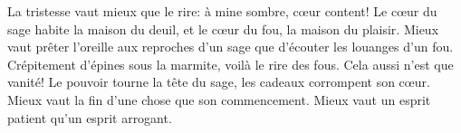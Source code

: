 La tristesse vaut mieux que le rire: à mine sombre, cœur content!
	Le cœur du sage habite la maison du deuil,
	et le cœur du fou, la maison du plaisir.
Mieux vaut prêter l’oreille aux reproches d’un sage
	que d’écouter les louanges d’un fou.
Crépitement d’épines sous la marmite, voilà le rire des fous.
	Cela aussi n’est que vanité!
Le pouvoir tourne la tête du sage, les cadeaux corrompent son cœur.
Mieux vaut la fin d’une chose que son commencement.
	Mieux vaut un esprit patient qu’un esprit arrogant.
